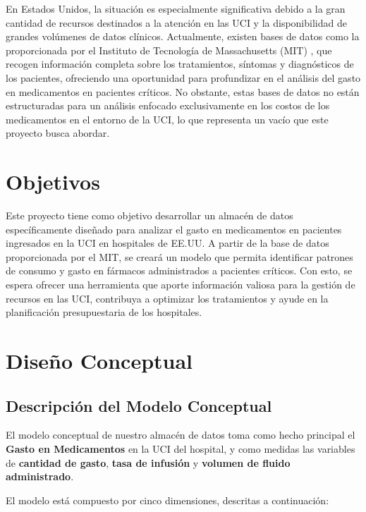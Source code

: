 \documentclass{article}
\begin{document}
En Estados Unidos, la situación es especialmente significativa debido a la gran cantidad de recursos destinados a la atención en las UCI y la disponibilidad de grandes volúmenes de datos clínicos. Actualmente, existen bases de datos como la proporcionada por el Instituto de Tecnología de Massachusetts (MIT) \cite{eicu_crd}, que recogen información completa sobre los tratamientos, síntomas y diagnósticos de los pacientes, ofreciendo una oportunidad para profundizar en el análisis del gasto en medicamentos en pacientes críticos. No obstante, estas bases de datos no están estructuradas para un análisis enfocado exclusivamente en los costos de los medicamentos en el entorno de la UCI, lo que representa un vacío que este proyecto busca abordar.

\section{Objetivos}
\label{sec:objetivos}

Este proyecto tiene como objetivo desarrollar un almacén de datos específicamente diseñado para analizar el gasto en medicamentos en pacientes ingresados en la UCI en hospitales de EE.UU. A partir de la base de datos proporcionada por el MIT, se creará un modelo que permita identificar patrones de consumo y gasto en fármacos administrados a pacientes críticos. Con esto, se espera ofrecer una herramienta que aporte información valiosa para la gestión de recursos en las UCI, contribuya a optimizar los tratamientos y ayude en la planificación presupuestaria de los hospitales.

\section{Diseño Conceptual}
\label{sec:diseno_conceptual}

\subsection{Descripción del Modelo Conceptual}

El modelo conceptual de nuestro almacén de datos toma como hecho principal el \textbf{Gasto en Medicamentos} en la UCI del hospital, y como medidas las variables de \textbf{cantidad de gasto}, \textbf{tasa de infusión} y \textbf{volumen de fluido administrado}.

El modelo está compuesto por cinco dimensiones, descritas a continuación:
\end{document}
